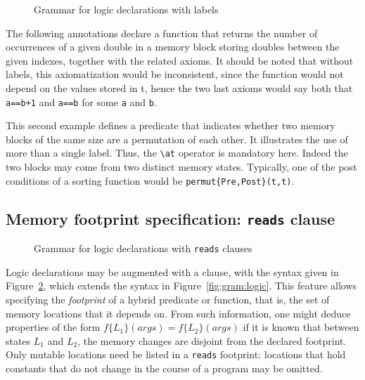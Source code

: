 \begin{figure}[t]
  \begin{cadre}
      
    \end{cadre}
  \caption{Grammar for logic declarations with labels}
\label{fig:gram:logiclabels}
\end{figure}

\begin{example}\label{ex:nb_occ}
  The following annotations declare a function that returns the
  number of occurrences of a given double in a memory block storing doubles
  between the given indexes, together with the related axioms.  It
  should be noted that without labels, this axiomatization would be
  inconsistent, since the function would not depend on the values
  stored in t, hence the two last axioms would say both that \lstinline|a==b+1|
  and \lstinline|a==b| for some \lstinline|a| and \lstinline|b|.
\end{example}

\begin{example}
  This second example defines a predicate that indicates whether two
  memory blocks of the same size are a permutation of each other. It
  illustrates the use of more than a single label. Thus, the \lstinline|\at|
  operator is mandatory here. Indeed the two blocks
  may come from two distinct memory states. Typically, one of the post
  conditions of a sorting function would be \lstinline|permut{Pre,Post}(t,t)|.
\end{example}


\subsection{Memory footprint specification: \texorpdfstring{\lstinline|reads|}{reads} clause}

\begin{figure}[t]
  \begin{cadre}
      
    \end{cadre}
  \caption{Grammar for logic declarations with \lstinline|reads| clauses}
\label{fig:gram:logicreads}
\end{figure}


\experimental

Logic declarations may be augmented with a \reads{} clause, with the
syntax given in Figure~\ref{fig:gram:logicreads}, which extends the
syntax in Figure~\ref{fig:gram:logic}. This feature allows specifying the
\emph{footprint} of a hybrid predicate or function, that is, the set of
memory locations that it depends on. From such information, one
might deduce properties of the form $f\{L_1\}(args) = f\{L_2\}(args)$
if it is known that between states $L_1$ and $L_2$, the memory changes are
disjoint from the declared footprint.
Only mutable locations need be listed in a \lstinline|reads| footprint: 
locations that hold constants that do not change in the course of a program may be omitted.

